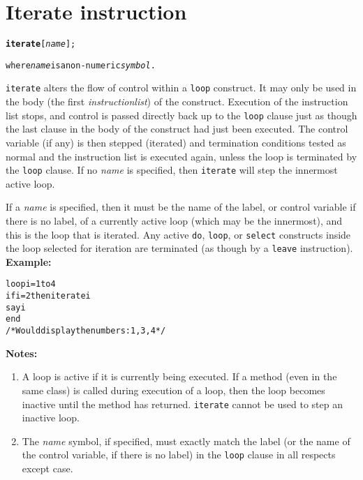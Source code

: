 \chapter{Iterate instruction}
\index{,}
\begin{shaded}
\begin{alltt}
\textbf{iterate} [\emph{name}];

where \emph{name} is a non-numeric \emph{symbol}.
\end{alltt}
\end{shaded}
 \texttt{iterate} alters the flow of control within a \texttt{loop}
construct.
It may only be used in the body (the first \emph{instructionlist})
of the construct.
 Execution of the instruction list stops, and control is passed
directly back up to the \texttt{loop} clause just as though the last
clause in the body of the construct had just been executed.
The control variable (if any) is then stepped (iterated) and termination
conditions tested as normal and the instruction list is executed again,
unless the loop is terminated by the \texttt{loop} clause.
 If no \emph{name} is specified, then \texttt{iterate} will step
the innermost active loop.
 
If a \emph{name} is specified, then it must be the name of the
label, or control variable if there is no label, of a currently active
loop (which may be the innermost), and this is the loop that is
iterated.
Any active \texttt{do}, \texttt{loop}, or \texttt{select} constructs
inside the loop selected for iteration are terminated (as though by a
\texttt{leave} instruction).
 \textbf{Example:}
\begin{alltt}
loop i=1 to 4
  if i=2 then iterate i
  say i
  end
/* Would display the numbers:  1, 3, 4  */
\end{alltt}
 \textbf{Notes:}
\begin{enumerate}
\item A loop is active if it is currently being executed.
If a method (even in the same class) is called during execution of a
loop, then the loop becomes inactive until the method has returned.
\texttt{iterate} cannot be used to step an inactive loop.
\item The \emph{name} symbol, if specified, must exactly match the
label (or the name of the control variable, if there is no label) in the
\texttt{loop} clause in all respects except case.
\end{enumerate}
